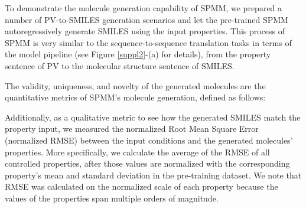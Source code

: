\documentclass{nature_meth}
\newcommand{\1}{\blmath{1}}
\newcommand{\0}{\blmath{0}}
\begin{document}
To demonstrate the molecule generation capability of SPMM, we prepared a number of PV-to-SMILES generation scenarios and let the pre-trained SPMM autoregressively generate SMILES using the input properties. This process of SPMM is very similar to the sequence-to-sequence translation tasks in terms of the model pipeline (see Figure \ref{suppl2}-(a) for details), from the property sentence of PV to the molecular structure sentence of SMILES. 

The validity, uniqueness, and novelty of the generated molecules are the quantitative metrics of SPMM's molecule generation, defined as follows:

Additionally, as a  qualitative metric to see how the generated SMILES match the property input, we measured the normalized Root Mean Square Error (normalized RMSE) between the input conditions and the generated molecules' properties. More specifically, we calculate the average of the RMSE of all controlled properties, after those values are normalized with the corresponding property's mean and standard deviation in the pre-training dataset. We note that RMSE was calculated on the normalized scale of each property because the values of the properties span multiple orders of magnitude. 

\begin{table}[!hbt]
\centering
{}
\vspace*{-0.5cm}
\caption{\bf\footnotesize 
Quantitative and qualitative results on various scenarios of PV-to-SMILES generation tasks, with the mean value and standard deviations. For deterministic sampling, we ran the experiment with four different random sets of 1,000 unseen PVs. In the case of stochastic scenarios, four different random seeds were used for each experiment.
}
\label{tablead1}
\end{table}
\end{document}
